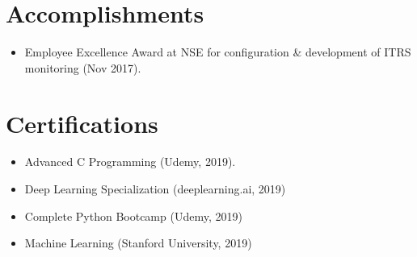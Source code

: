 \documentclass[letterpaper,11pt]{article}
\newcommand{\resumeItem}[2]{
  \item\small{
    \textbf{#1}{ #2 \vspace{-2pt}}
  }
}
\newcommand{\resumeSubItem}[2]{\resumeItem{#1}{#2}\vspace{-4pt}}
\newcommand{\resumeSubHeadingListStart}{\begin{itemize}[leftmargin=*]}
\newcommand{\resumeSubHeadingListEnd}{\end{itemize}}
\begin{document}
\section{Accomplishments}
\resumeSubHeadingListStart
  \resumeSubItem{}{Employee Excellence Award at NSE for configuration \& development of ITRS monitoring (Nov 2017).}
 \resumeSubHeadingListEnd
\section{Certifications}
 \resumeSubHeadingListStart
 \resumeSubItem{}{Advanced C Programming (Udemy, 2019).}
  \resumeSubItem{}{Deep Learning Specialization (deeplearning.ai, 2019)}
  \resumeSubItem{}{Complete Python Bootcamp (Udemy, 2019)}
  \resumeSubItem{}{Machine Learning (Stanford University, 2019)}
 \resumeSubHeadingListEnd
\end{document}
